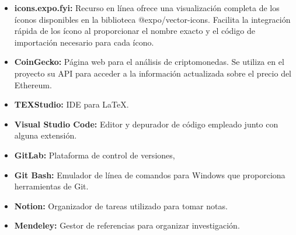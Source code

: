 \begin{itemize}

\item \textbf{icons.expo.fyi:} Recurso en línea ofrece una visualización completa de los íconos disponibles en la biblioteca @expo/vector-icons.
Facilita la integración rápida de los ícono al proporcionar el nombre exacto y el código de importación necesario para cada ícono.

\item \textbf{CoinGecko:} Página web para el análisis de criptomonedas. Se utiliza en el proyecto su API para acceder a la información actualizada sobre el precio del Ethereum. 

\item \textbf{TEXStudio:} IDE para LaTeX.

\item \textbf{Visual Studio Code:} Editor y depurador de código empleado junto con alguna extensión.

\item \textbf{GitLab:} Plataforma de control de versiones,

\item \textbf{Git Bash:} Emulador de línea de comandos para Windows que proporciona herramientas de Git.

\item \textbf{Notion:} Organizador de tareas utilizado para tomar notas.

\item \textbf{Mendeley:} Gestor de referencias para organizar investigación.

\end{itemize}











